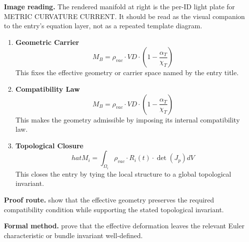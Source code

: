 \begin{samepage}
\noindent\begin{minipage}[t]{0.45\linewidth}
\vspace{0pt}
\raggedright
\scriptsize\textbf{Image reading.} The rendered manifold at right is the per-ID light plate for METRIC CURVATURE CURRENT. It should be read as the visual companion to the entry's equation layer, not as a repeated template diagram.\par
\end{minipage}\hfill
\begin{minipage}[t]{0.53\linewidth}
\vspace*{-0.10in}
\raggedright
{}
\end{minipage}
\end{samepage}

\clearpage


\begin{enumerate}[leftmargin=1.6em,itemsep=9pt,topsep=6pt]
\item \textbf{Geometric Carrier}
\[
M_B = \rho_{vac} \cdot VD \cdot \left(1 - \frac{\alpha_T}{\chi_T}\right)
\]
This fixes the effective geometry or carrier space named by the entry title.

\item \textbf{Compatibility Law}
\[
M_B = \rho_{vac} \cdot VD \cdot \left(1 - \frac{\alpha_T}{\chi_T}\right)
\]
This makes the geometry admissible by imposing its internal compatibility law.

\item \textbf{Topological Closure}
\[
hat{M}_i = \int_{\Omega_i} \rho_{vac} \cdot R_i(t) \cdot \det(J_p) dV
\]
This closes the entry by tying the local structure to a global topological invariant.
\end{enumerate}

\textbf{Proof route.} show that the effective geometry preserves the required compatibility condition while supporting the stated topological invariant.

\textbf{Formal method.} prove that the effective deformation leaves the relevant Euler characteristic or bundle invariant well-defined.

\medskip
{}

